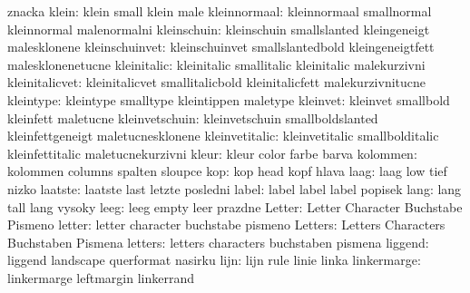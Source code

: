                       znacka
              klein:  klein                small               klein
                      male
       kleinnormaal:  kleinnormaal         smallnormal         kleinnormal
                      malenormalni
        kleinschuin:  kleinschuin          smallslanted        kleingeneigt
                      malesklonene
     kleinschuinvet:  kleinschuinvet       smallslantedbold    kleingeneigtfett
                      malesklonenetucne
        kleinitalic:  kleinitalic          smallitalic         kleinitalic
                      malekurzivni
     kleinitalicvet:  kleinitalicvet       smallitalicbold     kleinitalicfett
                      malekurzivnitucne
          kleintype:  kleintype            smalltype           kleintippen
                      maletype
           kleinvet:  kleinvet             smallbold           kleinfett
                      maletucne
     kleinvetschuin:  kleinvetschuin       smallboldslanted    kleinfettgeneigt
                      maletucnesklonene
     kleinvetitalic:  kleinvetitalic       smallbolditalic     kleinfettitalic
                      maletucnekurzivni
              kleur:  kleur                color               farbe
                      barva
           kolommen:  kolommen             columns             spalten
                      sloupce
                kop:  kop                  head                kopf
                      hlava
               laag:  laag                 low                 tief
                      nizko
            laatste:  laatste              last                letzte
                      posledni
              label:  label                label               label
                      popisek
               lang:  lang                 tall                lang
                      vysoky
               leeg:  leeg                 empty               leer
                      prazdne
             Letter:  Letter               Character           Buchstabe
                      Pismeno
             letter:  letter               character           buchstabe
                      pismeno
            Letters:  Letters              Characters          Buchstaben
                      Pismena
            letters:  letters              characters          buchstaben
                      pismena
            liggend:  liggend              landscape           querformat
                      nasirku
               lijn:  lijn                 rule                linie
                      linka
        linkermarge:  linkermarge          leftmargin          linkerrand
